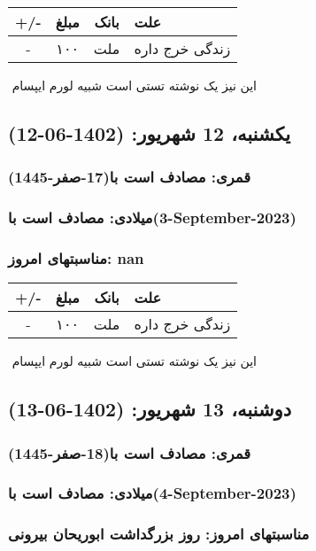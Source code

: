 \documentclass{article}
\newcommand{\rnote}[1]{\marginpar{\textcolor{color}{\StrSubstitute{\##1}{ }{\_}}}}
\newcommand{\myRow}[4]{
    #1 & #2 & #3 & #4 \\ \hline
}
\begin{document}
\begin{tabular}{ | c | c | c | p{5cm} |}
    \hline
    \myRow{ +/- }{مبلغ}{بانک}{علت}
    \myRow{-}{۱۰۰}{ملت}{زندگی خرج داره}
\end{tabular}
\newline
\newline

‌
\rnote{تست}
این نیز یک نوشته تستی است شبیه لورم ایپسام




\newpage
{}
\textcolor{color}{
\section{ یکشنبه، 12 شهریور: (1402-06-12) }
\subsubsection*{قمری: مصادف است با(17-صفر-1445)} 
\subsubsection*{میلادی: مصادف است با(3-September-2023)}
\subsubsection*{مناسبتهای امروز: nan}
}


\begin{tabular}{ | c | c | c | p{5cm} |}
    \hline
    \myRow{ +/- }{مبلغ}{بانک}{علت}
    \myRow{-}{۱۰۰}{ملت}{زندگی خرج داره}
\end{tabular}
\newline
\newline

‌
\rnote{تست}
این نیز یک نوشته تستی است شبیه لورم ایپسام




\newpage
{}
\textcolor{color}{
\section{ دوشنبه، 13 شهریور: (1402-06-13) }
\subsubsection*{قمری: مصادف است با(18-صفر-1445)} 
\subsubsection*{میلادی: مصادف است با(4-September-2023)}
\subsubsection*{مناسبتهای امروز: روز بزرگداشت ابوریحان بیرونی}
}
\end{document}

